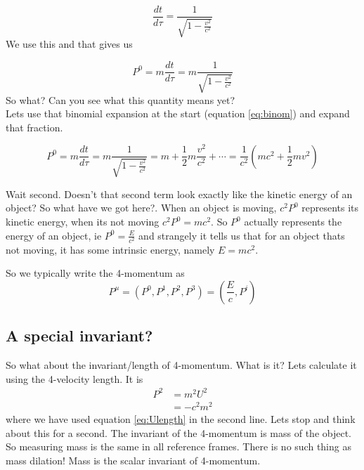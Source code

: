 \begin{equation}
  \frac{dt}{d\tau} = \frac{1}{\sqrt{1  - \frac{v^2}{c^2}}}
\end{equation}
We use this and that gives us

\begin{equation}
  P^0 = m \frac{dt}{d\tau} = m \frac{1}{\sqrt{1 - \frac{v^2}{c^2}}} 
\end{equation}
So what? Can you see what this quantity means yet? \\
Lets use that binomial expansion at the start (equation \eqref{eq:binom}) and expand that fraction. 

\begin{equation}
  P^0 = m \frac{dt}{d\tau} = m \frac{1}{\sqrt{1 - \frac{v^2}{c^2}}} = m + \frac{1}{2} m \frac{v^2}{c^2} + \cdots = \frac{1}{c^2} (m c^2 + \frac{1}{2}m v^2)
\end{equation}

Wait second. Doesn't that second term look exactly like the kinetic energy of an object? So what have we got here?. When an object is moving, $c^2 P^0$ represents its kinetic energy, when its not moving $c^2 P^0 = m c^2$. So $P^0$ actually represents the energy of an object, ie $P^0 = \frac{E}{c^2}$ and strangely it tells us that for an object thats not moving, it has some intrinsic energy, namely $E = m c^2$. 

So we typically write the 4-momentum as
\begin{equation}
  P^\mu = (P^0, P^1, P^2, P^3) = (\frac{E}{c}, P^i)
  \label{eq:4P}
\end{equation}


\subsection{A special invariant?}

So what about the invariant/length of 4-momentum. What is it? Lets calculate it using the 4-velocity length.
It is
\begin{equation}
  \begin{aligned}
  P^2 &= m^2 U^2 \\
      &= -c^2 m^2
    \end{aligned}
    \label{eq:p2}
\end{equation}
where we have used equation \eqref{eq:Ulength} in the second line. Lets stop and think about this for a second. The invariant of the 4-momentum is mass of the object. So measuring mass is the same in all reference frames. There is no such thing as mass dilation! Mass is the scalar invariant of 4-momentum. 

